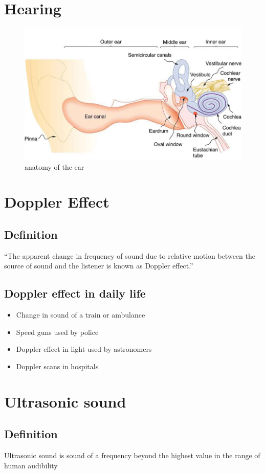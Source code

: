 \documentclass[12pt]{book}
\begin{document}
\chapter{Hearing}
\begin{figure}[htpb]
    \centering
    \includegraphics[width=0.8\linewidth]{earanatomy.jpeg}
    \caption{anatomy of the ear}%
    \label{fig:anatomy of the ear.}
\end{figure}
\chapter{Doppler Effect}
\section*{Definition}
“The apparent change in frequency of sound
due to relative motion between the source
of sound and the listener is known as Doppler
effect.”

\section*{Doppler effect in daily life}
\begin{itemize}
\item  Change in sound of a train or ambulance
\item  Speed guns used by police
\item  Doppler effect in light used by astronomers
\item  Doppler scans in hospitals
\end{itemize}


\chapter{Ultrasonic sound}
\section*{Definition}
Ultrasonic sound is sound of a frequency
beyond the highest value in the range of
human audibility
\end{document}
